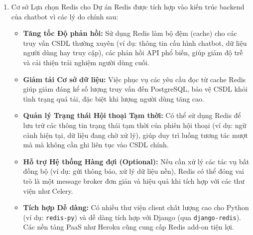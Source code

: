 \begin{enumerate}[label=\arabic*., font=\bfseries]
    \item Cơ sở Lựa chọn Redis cho Dự án
    Redis được tích hợp vào kiến trúc backend của chatbot vì các lý do chính sau:
    \begin{itemize}
        \item \textbf{Tăng tốc Độ phản hồi:} Sử dụng Redis làm bộ đệm (cache) cho các truy vấn CSDL thường xuyên (ví dụ: thông tin cấu hình chatbot, dữ liệu người dùng hay truy cập), các phản hồi API phổ biến, giúp giảm độ trễ và cải thiện trải nghiệm người dùng cuối.
        \item \textbf{Giảm tải Cơ sở dữ liệu:} Việc phục vụ các yêu cầu đọc từ cache Redis giúp giảm đáng kể số lượng truy vấn đến PostgreSQL, bảo vệ CSDL khỏi tình trạng quá tải, đặc biệt khi lượng người dùng tăng cao.
        \item \textbf{Quản lý Trạng thái Hội thoại Tạm thời:} Có thể sử dụng Redis để lưu trữ các thông tin trạng thái tạm thời của phiên hội thoại (ví dụ: ngữ cảnh hiện tại, dữ liệu đang chờ xử lý), giúp duy trì luồng tương tác mượt mà mà không cần ghi liên tục vào CSDL chính.
        \item \textbf{Hỗ trợ Hệ thống Hàng đợi (Optional):} Nếu cần xử lý các tác vụ bất đồng bộ (ví dụ: gửi thông báo, xử lý dữ liệu nền), Redis có thể đóng vai trò là một message broker đơn giản và hiệu quả khi tích hợp với các thư viện như Celery.
        \item \textbf{Tích hợp Dễ dàng:} Có nhiều thư viện client chất lượng cao cho Python (ví dụ: \texttt{redis-py}) và dễ dàng tích hợp với Django (qua \texttt{django-redis}). Các nền tảng PaaS như Heroku cũng cung cấp Redis add-on tiện lợi.
    \end{itemize}
\end{enumerate}


